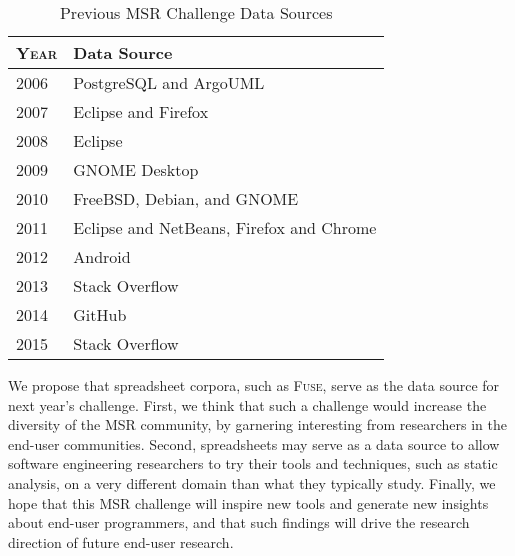 \documentclass[conference]{IEEEtran}
\begin{document}
\begin{table}[!t]
\caption{Previous MSR Challenge Data Sources\label{tab:datasources}}
\centering
\begin{tabular}{ll}
\toprule
\textbf{\textsc{Year}} & \textbf{Data Source}\\
\midrule
2006 & PostgreSQL and ArgoUML\\
2007 & Eclipse and Firefox\\
2008 & Eclipse\\
2009 & GNOME Desktop\\
2010 & FreeBSD, Debian, and GNOME\\
2011 & Eclipse and NetBeans, Firefox and Chrome\\
2012 & Android\\
2013 & Stack Overflow\\
2014 & GitHub\\
2015 & Stack Overflow\\
\bottomrule
\end{tabular}
\end{table}

We propose that spreadsheet corpora, such as \textsc{Fuse}, serve as the data source for next year's challenge. First, we think that such a challenge would increase the diversity of the MSR community, by garnering interesting from researchers in the end-user communities. 
Second, spreadsheets may serve as a data source to allow software engineering researchers to try their tools and techniques, such as static analysis, on a very different domain than what they typically study. 
Finally, we hope that this MSR challenge will inspire new tools and generate new insights about end-user programmers, and that such findings will drive the research direction of future end-user research.

\end{document}
